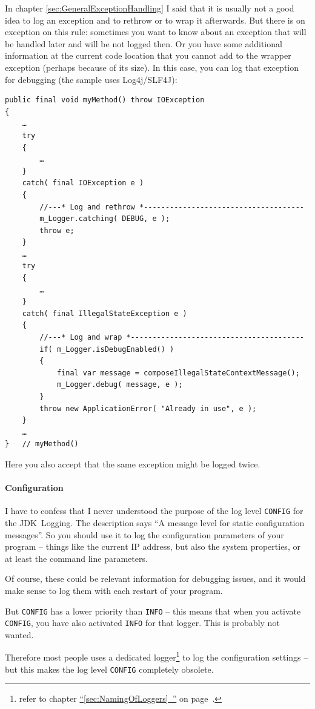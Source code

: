 \documentclass[11pt,a4paper, titlepage, parskip=half, headsepline, footsepline, cleardoublepage=current, headheight=1cm]{scrbook}
\newcommand*{\tqfullvref}[1]{\hyperref[{#1}]{“\ref*{#1}~\nameref*{#1}”} on page~\pageref{#1}}
\newcommand*{\tqref}[1]{\hyperref[{#1}]{\ref*{#1}}}
\begin{document}
In chapter \tqref{sec:GeneralExceptionHandling} I said that it is usually not a good idea to log an exception and to rethrow or to wrap it afterwards. But there is on exception on this rule: sometimes you want to know about an exception that will be handled later and will be not logged then. Or you have some additional information at the current code location that you cannot add to the wrapper exception (perhaps because of its size). In this case, you can log that exception for debugging (the sample uses Log4j/SLF4J): 
\begin{lstlisting}
public final void myMethod() throw IOException
{
    …
    try
    {
        …
    }
    catch( final IOException e )
    {
        //---* Log and rethrow *-------------------------------------
        m_Logger.catching( DEBUG, e );
        throw e;
    }
    …
    try
    {
        …
    }
    catch( final IllegalStateException e )
    {
        //---* Log and wrap *----------------------------------------
        if( m_Logger.isDebugEnabled() )
        {
            final var message = composeIllegalStateContextMessage();
            m_Logger.debug( message, e );
        }    
        throw new ApplicationError( "Already in use", e );
    }
    …
}   // myMethod()
\end{lstlisting}

Here you also accept that the same exception might be logged twice.

\paragraph{Configuration} I have to confess that I never understood the purpose of the log level \verb#CONFIG# for the JDK~Logging. The description says “A message level for static configuration messages”. So you should use it to log the configuration parameters of your program – things like the current IP address, but also the system properties, or at least the command line parameters.

Of course, these could be relevant information for debugging issues, and it would make sense to log them with each restart of your program.

But \verb#CONFIG# has a lower priority than \verb#INFO# – this means that when you activate \verb#CONFIG#, you have also activated \verb#INFO# for that logger. This is probably not wanted.

Therefore most people uses a dedicated logger\footnote{refer to chapter \tqfullvref{sec:NamingOfLoggers}.} to log the configuration settings – but this makes the log level \verb#CONFIG# completely obsolete.
\end{document}
